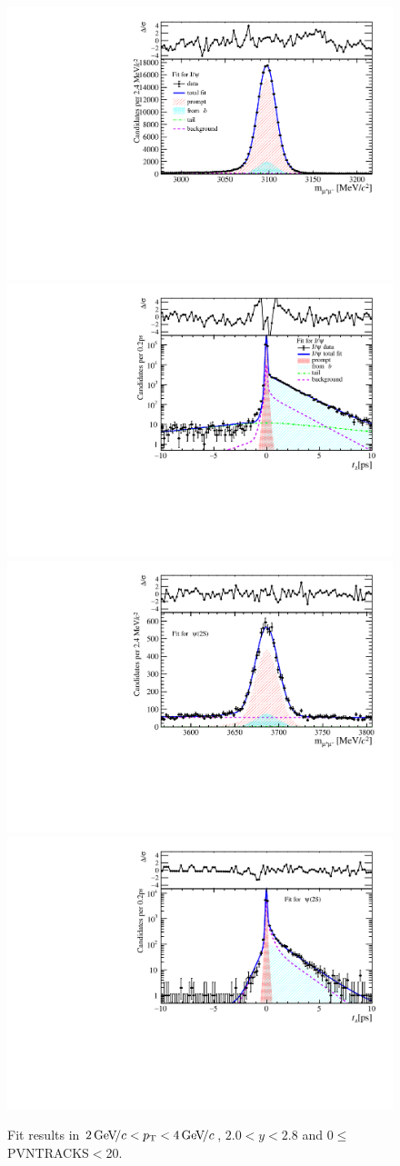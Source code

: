 \begin{figure}[H]
\begin{center}
\includegraphics[width=0.47\linewidth]{pdf/Jpsi/drawmass/n1y1pt2.pdf}
\includegraphics[width=0.47\linewidth]{pdf/Jpsi/2DFit/n1y1pt2.pdf}
\vspace*{-0.5cm}
\includegraphics[width=0.47\linewidth]{pdf/Psi2S/drawmass/n1y1pt2.pdf}
\includegraphics[width=0.47\linewidth]{pdf/Psi2S/2DFit/n1y1pt2.pdf}
\vspace*{-0.5cm}
\end{center}
\caption{Fit results in $2\text{\,Ge\kern -0.1em V\!/}c<p_{\mathrm{T}}<4\text{\,Ge\kern -0.1em V\!/}c$, $2.0<y<2.8$ and 0$\leq$PVNTRACKS$<$20.}
\label{Fitn1y1pt2}
\end{figure}
